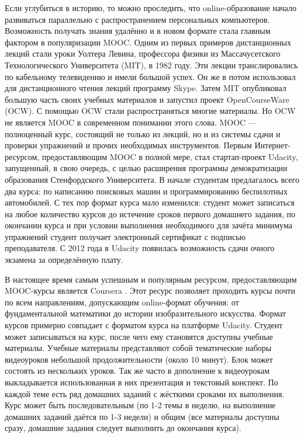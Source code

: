\documentclass{matmex-diploma-custom}
\begin{document}
Если углубиться в историю, то можно проследить, что online-образование
начало развиваться параллельно с распространением персональных
компьютеров. Возможность получать знания удалённо и в новом формате
стала главным фактором в популяризации MOOC. Одним из первых примеров
дистанционных лекций стали уроки Уолтера Левина, профессора физики из
Массачусетского Технологического Университета (MIT), в 1982 году. Эти
лекции транслировались по кабельному телевидению и имели большой
успех. Он же в потом использовал для дистанционного чтения лекций
программу Skype. Затем MIT опубликовал большую часть своих учебных
материалов и запустил проект OpenCourseWare (OCW). С помощью OCW стали
распространяться многие материалы. Но OCW не является MOOC в
современном понимании этого слова. MOOC --- полноценный курс,
состоящий не только из лекций, но и из системы сдачи и проверки
упражнений и прочих необходимых инструментов. Первым
Интернет-ресурсом, предоставляющим MOOC в полной мере, стал
стартап-проект Udacity, запущенный, в свою очередь, с целью расширения
программы демократизации образования Стенфордского Университета. В
начале студентам предлагалось всего два курса: по написанию поисковых
машин и программированию беспилотных автомобилей. С тех пор формат
курса мало изменился: студент может записаться на любое количество
курсов до истечение сроков первого домашнего задания, по окончании
курса и при условии выполнения необходимого для зачёта минимума
упражнений студент получает электронный сертификат с подписью
преподавателя. С 2012 года в Udacity появилась возможность сдачи
очного экзамена за определённую плату.

В настоящее время самым успешным и популярным ресурсом,
предоставляющим MOOC-курсы является Coursera \cite{coursera}. Этот
ресурс позволяет проходить курсы почти по всем направлениям,
допускающим online-формат обучения: от фундаментальной математики до
истории изобразительного искусства. Формат курсов примерно совпадает с
форматом курса на платформе Udacity. Студент может записываться на
курс, после чего ему становятся доступны учебные материалы. Учебные
материалы представляют собой тематические наборы видеоуроков небольшой
продолжительности (около 10 минут). Блок может состоять из нескольких
уроков. Так же часто в дополнение к видеоурокам выкладывается
использованная в них презентация и текстовый конспект. По каждой теме
есть ряд домашних заданий с жёсткими сроками их выполнения. Курс может
быть последовательным (по 1-2 темы в неделю, на выполнение домашних
заданий даётся по 1-3 недели) и общим (все материалы доступны сразу,
домашние задания следует выполнить до окончания курса).
\end{document}
